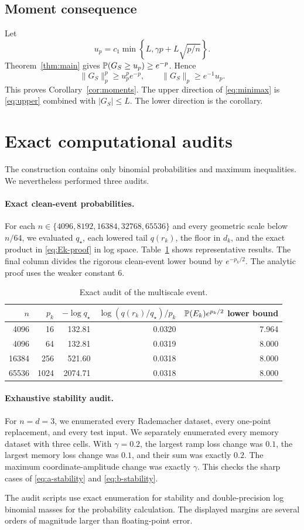 \subsection{Moment consequence}

Let
\[
 u_p=c_1\min\!\left\{L,\gamma p+L\sqrt{p/n}\right\}.
\]
Theorem~\ref{thm:main} gives $\mathbb P(G_S\ge u_p)\ge e^{-p}$. Hence
\[
 \|G_S\|_p^p\ge u_p^p e^{-p},
 \qquad
 \|G_S\|_p\ge e^{-1}u_p.
\]
This proves Corollary~\ref{cor:moments}. The upper direction of \eqref{eq:minimax} is
\eqref{eq:upper} combined with $|G_S|\le L$. The lower direction is the corollary.

\section{Exact computational audits}\label{app:audit}

The construction contains only binomial probabilities and maximum inequalities. We nevertheless
performed three audits.

\paragraph{Exact clean-event probabilities.}
For each $n\in\{4096,8192,16384,32768,65536\}$ and every geometric scale below $n/64$, we
evaluated $q_\star$, each lowered tail $q(r_k)$, the floor in $d_k$, and the exact product in
\eqref{eq:Ek-proof} in log space. Table~\ref{tab:audit} shows representative results. The final
column divides the rigorous clean-event lower bound by $e^{-p_k/2}$. The analytic proof uses the
weaker constant $6$.

\begin{table}[h]
\centering
\caption{Exact audit of the multiscale event.}
\label{tab:audit}
\begin{tabular}{rrrrr}
\toprule
$n$ & $p_k$ & $-\log q_\star$ & $\log(q(r_k)/q_\star)/p_k$ &
$\mathbb P(E_k)e^{p_k/2}$ lower bound\\
\midrule
4096  & 16   & 132.81  & 0.0320 & 7.964\\
4096  & 64   & 132.81  & 0.0319 & 8.000\\
16384 & 256  & 521.60  & 0.0318 & 8.000\\
65536 & 1024 & 2074.71 & 0.0318 & 8.000\\
\bottomrule
\end{tabular}
\end{table}

\paragraph{Exhaustive stability audit.}
For $n=d=3$, we enumerated every Rademacher dataset, every one-point replacement, and every test
input. We separately enumerated every memory dataset with three cells. With $\gamma=0.2$, the
largest ramp loss change was $0.1$, the largest memory loss change was $0.1$, and their sum was
exactly $0.2$. The maximum coordinate-amplitude change was exactly $\gamma$. This checks the
sharp cases of \eqref{eq:a-stability} and \eqref{eq:b-stability}.

The audit scripts use exact enumeration for stability and double-precision log binomial masses for
the probability calculation. The displayed margins are several orders of magnitude larger than
floating-point error.
